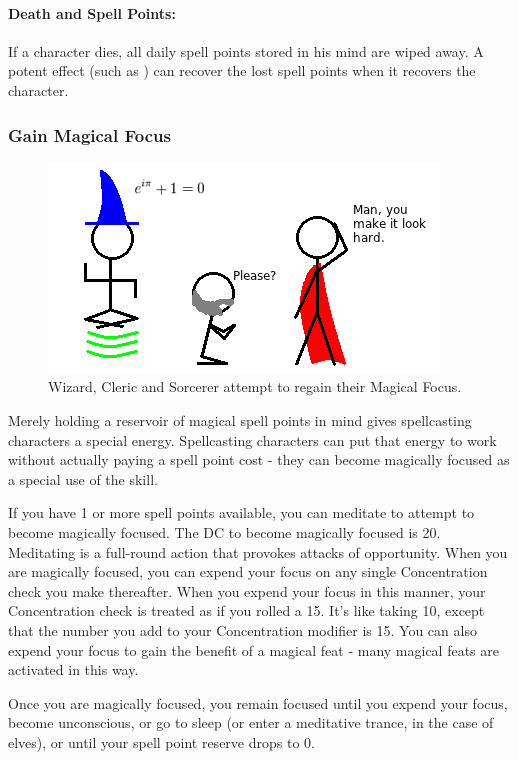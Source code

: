 \paragraph{Death and Spell Points:} If a character dies, all daily spell points stored in his mind are wiped away. 
A potent effect (such as ) can recover the lost spell points when it recovers the character.
\subsubsection[Magical Focus]{Gain Magical Focus}

\begin{figure}
  \caption{Wizard, Cleric and Sorcerer attempt to regain their Magical Focus.}
  \centering
    \includegraphics{Pics/SpellPoints.png}
\end{figure}

\label{sec:MagicFocus}
Merely holding a reservoir of magical spell points in mind gives spellcasting characters a special energy. 
Spellcasting characters can put that energy to work without actually paying a spell point cost - they can become magically focused as a special use of the  skill.

If you have 1 or more spell points available, you can meditate to attempt to become magically focused. 
The DC to become magically focused is 20. Meditating is a full-round action that provokes attacks of opportunity. 
When you are magically focused, you can expend your focus on any single Concentration check you make thereafter. 
When you expend your focus in this manner, your Concentration check is treated as if you rolled a 15. 
It's like taking 10, except that the number you add to your Concentration modifier is 15. 
You can also expend your focus to gain the benefit of a magical feat - many magical feats are activated in this way.

Once you are magically focused, you remain focused until you expend your focus, become unconscious, or go to sleep (or enter a meditative trance, in the case of elves), or until your spell point reserve drops to 0.
